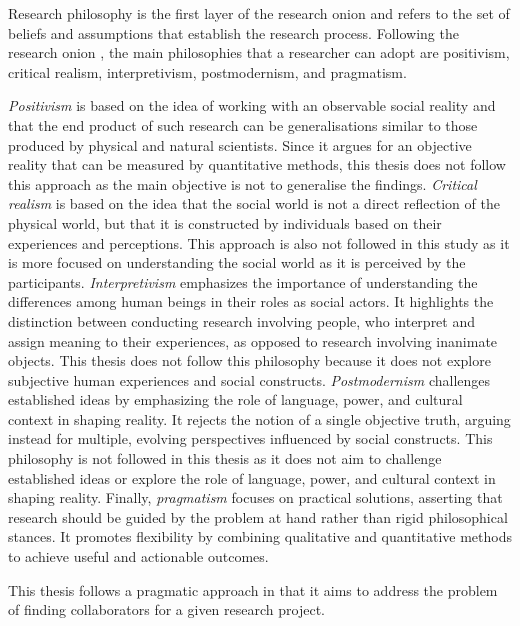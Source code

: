 Research philosophy is the first layer of the research onion and refers to the set of beliefs and assumptions that establish the research process.
Following the research onion \cite{SaundersMark2023}, the main philosophies that a researcher can adopt are positivism, critical realism, interpretivism, postmodernism, and pragmatism.

\textit{Positivism} is based on the idea of working with an observable social reality and that the end product of such research can be generalisations similar to those produced by physical and natural scientists.
Since it argues for an objective reality that can be measured by quantitative methods, this thesis does not follow this approach as the main objective is not to generalise the findings.
\textit{Critical realism} is based on the idea that the social world is not a direct reflection of the physical world, but that it is constructed by individuals based on their experiences and perceptions.
This approach is also not followed in this study as it is more focused on understanding the social world as it is perceived by the participants.
\textit{Interpretivism} emphasizes the importance of understanding the differences among human beings in their roles as social actors.
It highlights the distinction between conducting research involving people, who interpret and assign meaning to their experiences, as opposed to research involving inanimate objects.
This thesis does not follow this philosophy because it does not explore subjective human experiences and social constructs.
\textit{Postmodernism} challenges established ideas by emphasizing the role of language, power, and cultural context in shaping reality.
It rejects the notion of a single objective truth, arguing instead for multiple, evolving perspectives influenced by social constructs.
This philosophy is not followed in this thesis as it does not aim to challenge established ideas or explore the role of language, power, and cultural context in shaping reality.
Finally, \textit{pragmatism} focuses on practical solutions, asserting that research should be guided by the problem at hand rather than rigid philosophical stances.
It promotes flexibility by combining qualitative and quantitative methods to achieve useful and actionable outcomes.

This thesis follows a pragmatic approach in that it aims to address the problem of finding collaborators for a given research project.